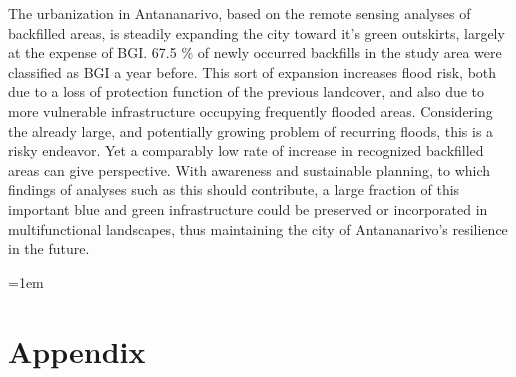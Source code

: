 \documentclass[11pt, A4, oneside]{report}
\begin{document}
The urbanization in Antananarivo, based on the remote sensing analyses of backfilled areas, is steadily expanding the city toward it's green outskirts, largely at the expense of BGI. 67.5 \% of newly occurred backfills in the study area were classified as BGI a year before. This sort of expansion increases flood risk, both due to a loss of protection function of the previous landcover, and also due to more vulnerable infrastructure occupying frequently flooded areas. Considering the already large, and potentially growing problem of recurring floods, this is a risky endeavor. Yet a comparably low rate of increase in recognized backfilled areas can give perspective. With awareness and sustainable planning, to which findings of analyses such as this should contribute, a large fraction of this important blue and green infrastructure could be preserved or incorporated in multifunctional landscapes, thus maintaining the city of Antananarivo's resilience in the future.


\newpage
{}
\emergencystretch=1em
\printbibliography


\newpage
{}
\chapter*{Appendix}




\newpage
{}
\end{document}
